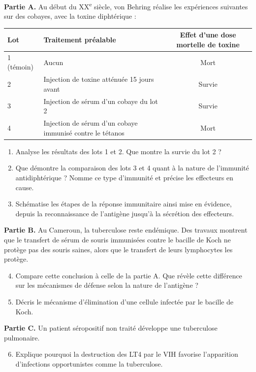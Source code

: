 \documentclass[11pt]{article}
\begin{document}
\begin{exercice}
\textbf{Partie A.} Au début du XX\textsuperscript{e} siècle, von Behring réalise les expériences suivantes sur des cobayes, avec la toxine diphtérique :
\begin{center}
\begin{tabular}{|l|l|c|}
\hline
\rowcolor{popblueL} Lot & Traitement préalable & Effet d'une dose mortelle de toxine \\
\hline
1 (témoin) & Aucun & Mort \\
\hline
2 & Injection de toxine atténuée 15 jours avant & Survie \\
\hline
3 & Injection de sérum d'un cobaye du lot 2 & Survie \\
\hline
4 & Injection de sérum d'un cobaye immunisé contre le tétanos & Mort \\
\hline
\end{tabular}
\end{center}
\begin{enumerate}
\item Analyse les résultats des lots 1 et 2. Que montre la survie du lot 2 ?
\item Que démontre la comparaison des lots 3 et 4 quant à la nature de l'immunité antidiphtérique ? Nomme ce type d'immunité et précise les effecteurs en cause.
\item Schématise les étapes de la réponse immunitaire ainsi mise en évidence, depuis la reconnaissance de l'antigène jusqu'à la sécrétion des effecteurs.
\end{enumerate}

\textbf{Partie B.} Au Cameroun, la tuberculose reste endémique. Des travaux montrent que le transfert de sérum de souris immunisées contre le bacille de Koch ne protège pas des souris saines, alors que le transfert de leurs lymphocytes les protège.
\begin{enumerate}
\setcounter{enumi}{3}
\item Compare cette conclusion à celle de la partie A. Que révèle cette différence sur les mécanismes de défense selon la nature de l'antigène ?
\item Décris le mécanisme d'élimination d'une cellule infectée par le bacille de Koch.
\end{enumerate}

\textbf{Partie C.} Un patient séropositif non traité développe une tuberculose pulmonaire.
\begin{enumerate}
\setcounter{enumi}{5}
\item Explique pourquoi la destruction des LT4 par le VIH favorise l'apparition d'infections opportunistes comme la tuberculose.
\end{enumerate}
\end{exercice}
\end{document}
